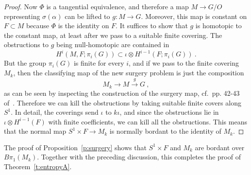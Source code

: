 \documentclass[12pt]{amsart}
\theoremstyle{definition}
\theoremstyle{remark}
\begin{document}
\begin{proof}
Now $\Phi$ is a tangential equivalence, and therefore a map $M\longrightarrow G/O$ 
representing $\sigma(\alpha)$ can be lifted to $g\colon M\longrightarrow G$.
Moreover, this map is constant on $F \subset M$ because $\Phi$ is the identity on $F$. 
It suffices to show that $g$ is homotopic to the constant map, at least after we pass
to a suitable finite covering. The obstructions to $g$ being null-homotopic are contained in
$$
H^i(M,F;\pi_i(G)) \subset \iota\otimes H^{i-1}(F; \pi_i(G)) \ .
$$
But the group $\pi_i(G)$ is finite for every $i$, and if we pass to the finite covering
$M_k$, then 
the classifying map of the new surgery problem is just the composition
$$
M_k \longrightarrow M \stackrel{g}{\longrightarrow} G \ ,
$$
as can be seen by inspecting the construction of the surgery map, cf.~pp. 42-43 of~\cite{MM}.
Therefore we can kill the obstructions by taking suitable finite covers along $S^1$.
In detail, the coverings send $\iota$ to $k \iota$, and since the obstructions lie in
$\iota\otimes H^{i-1}(F)$ with finite coefficients, we can kill all the obstructions. This means that
the normal map  $S^1 \times F \longrightarrow M_k$ is normally bordant to the identity
of $M_k$.
\end{proof}
The proof of Proposition~\ref{p:surgery} shows that $S^1 \times F$ and $M_k$ are bordant 
over $B\pi_1 (M_k)$.
Together with the preceding discussion, this completes the proof of Theorem~\ref{t:entropyA}.
\end{document}
